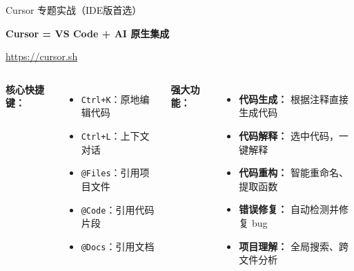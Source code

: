 
\begin{frame}{Cursor 专题实战（IDE版首选）}
	\begin{center}
		\Huge \textbf{Cursor = VS Code + AI 原生集成}

		\vspace{0.5cm}

		\normalsize
		\textcolor{blue}{\url{https://cursor.sh}}
	\end{center}

	\vspace{0.3cm}

	\begin{columns}
		\textbf{核心快捷键：}
		\begin{itemize}
			\item \texttt{Ctrl+K}：原地编辑代码
			\item \texttt{Ctrl+L}：上下文对话
			\item \texttt{@Files}：引用项目文件
			\item \texttt{@Code}：引用代码片段
			\item \texttt{@Docs}：引用文档
		\end{itemize}

		\textbf{强大功能：}
		\begin{itemize}
			\item \textbf{代码生成：} 根据注释直接生成代码
			\item \textbf{代码解释：} 选中代码，一键解释
			\item \textbf{代码重构：} 智能重命名、提取函数
			\item \textbf{错误修复：} 自动检测并修复 bug
			\item \textbf{项目理解：} 全局搜索、跨文件分析
		\end{itemize}
	\end{columns}
\end{frame}

